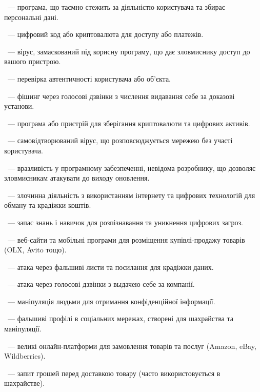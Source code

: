 ~--- програма, що таємно стежить за діяльністю користувача та збирає персональні дані.

~--- цифровий код або криптовалюта для доступу або платежів.

\newpage

~--- вірус, замаскований під корисну програму, що дає зловмиснику доступ до вашого пристрою.

~--- перевірка автентичності користувача або об'єкта.

~--- фішинг через голосові дзвінки з числення видавання себе за доказові установи.

~--- програма або пристрій для зберігання криптовалюти та цифрових активів.

~--- самовідтворюваний вірус, що розповсюджується мережею без участі користувача.

~--- вразливість у програмному забезпеченні, невідома розробнику, що дозволяє зловмисникам атакувати до виходу оновлення.

~--- злочинна діяльність з використанням інтернету та цифрових технологій для обману та крадіжки коштів.

~--- запас знань і навичок для розпізнавання та уникнення цифрових загроз.

~--- веб-сайти та мобільні програми для розміщення купівлі-продажу товарів (OLX, Avito тощо).

~--- атака через фальшиві листи та посилання для крадіжки даних.

~--- атака через голосові дзвінки з выдачею себе за компанії.

\newpage

~--- маніпуляція людьми для отримання конфіденційної інформації.

~--- фальшиві профілі в соціальних мережах, створені для шахрайства та маніпуляції.

~--- великі онлайн-платформи для замовлення товарів та послуг (Amazon, eBay, Wildberries).

~--- запит грошей перед доставкою товару (часто використовується в шахрайстве).

